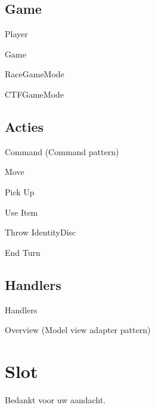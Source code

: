 \documentclass[11pt,t]{beamer}
\begin{document}
\subsection{Game}

\begin{frame}{Player}
\end{frame}

\begin{frame}{Game}
\end{frame}

\begin{frame}{RaceGameMode}
\end{frame}

\begin{frame}{CTFGameMode}
\end{frame}

\subsection{Acties}

\begin{frame}{Command (Command pattern)}
\end{frame}

\begin{frame}{Move}
\end{frame}

\begin{frame}{Pick Up}
\end{frame}

\begin{frame}{Use Item}
\end{frame}

\begin{frame}{Throw IdentityDisc}
\end{frame}

\begin{frame}{End Turn}
\end{frame}

\subsection{Handlers}

\begin{frame}{Handlers}
\end{frame}

\begin{frame}{Overview (Model view adapter pattern)}

\end{frame}
\section{Slot}
\begin{frame}
\vspace{1.5in}
\begin{center}
Bedankt voor uw aandacht.
\end{center}
\end{frame}
\end{document}
